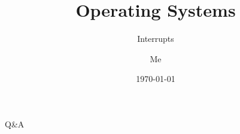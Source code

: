 \documentclass[12pt]{beamer}
\title{Operating Systems}
\subtitle{Interrupts}
\author{Me}
\date{\today}
\begin{document}
  \begin{frame}
    \titlepage
  \end{frame}

  
  

  \begin{frame}
  \begin{center}
  \Huge Q\&A
  \end{center}
  \end{frame}
\end{document}
